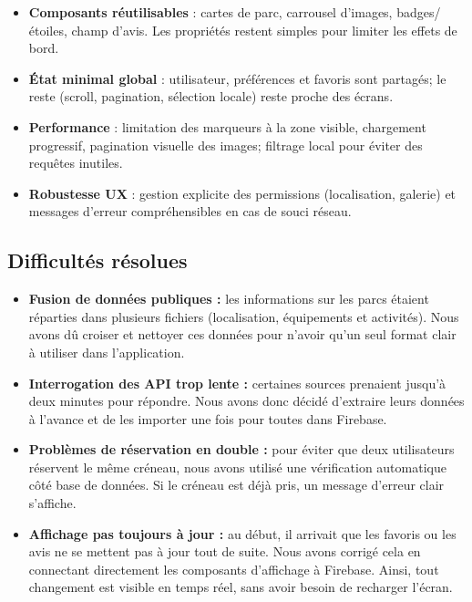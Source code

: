 \documentclass[12pt,a4paper]{article}
\begin{document}
\begin{itemize}
  \item \textbf{Composants réutilisables} : cartes de parc, carrousel d’images, badges/étoiles, champ d’avis. Les propriétés restent simples pour limiter les effets de bord.
  \item \textbf{État minimal global} : utilisateur, préférences et favoris sont partagés; le reste (scroll, pagination, sélection locale) reste proche des écrans.
  \item \textbf{Performance} : limitation des marqueurs à la zone visible, chargement progressif, pagination visuelle des images; filtrage local pour éviter des requêtes inutiles.
  \item \textbf{Robustesse UX} : gestion explicite des permissions (localisation, galerie) et messages d’erreur compréhensibles en cas de souci réseau.
\end{itemize}




\subsection{Difficultés résolues}

\begin{itemize}
  \item \textbf{Fusion de données publiques :} les informations sur les parcs étaient réparties dans plusieurs fichiers (localisation, équipements et activités). Nous avons dû croiser et nettoyer ces données pour n'avoir qu'un seul format clair à utiliser dans l'application.
  
  \item \textbf{Interrogation des API trop lente :} certaines sources prenaient jusqu'à deux minutes pour répondre. Nous avons donc décidé d'extraire leurs données à l'avance et de les importer une fois pour toutes dans Firebase.

  \item \textbf{Problèmes de réservation en double :} pour éviter que deux utilisateurs réservent le même créneau, nous avons utilisé une vérification automatique côté base de données. Si le créneau est déjà pris, un message d'erreur clair s'affiche.

  \item \textbf{Affichage pas toujours à jour :} au début, il arrivait que les favoris ou les avis ne se mettent pas à jour tout de suite. Nous avons corrigé cela en connectant directement les composants d'affichage à Firebase. Ainsi, tout changement est visible en temps réel, sans avoir besoin de recharger l'écran.
\end{itemize}
\end{document}
